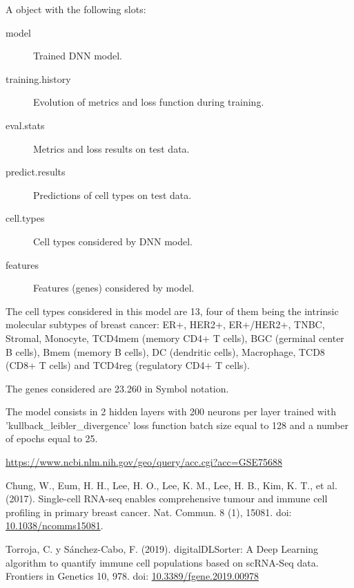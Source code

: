 \documentclass[a4paper]{book}
\begin{document}
\begin{Format}
A  object with the following slots:
\begin{description}
 \item[model] Trained DNN model.
\item[training.history] Evolution of metrics and loss function during
training.\item[eval.stats] Metrics and loss results on test data.
\item[predict.results] Predictions of cell types on test data.
\item[cell.types] Cell types considered by DNN model.
\item[features] Features (genes) considered by model.
\end{description}

\end{Format}
%
\begin{Details}\relax
The cell types considered in this model are 13, four of them being the
intrinsic molecular subtypes of breast cancer: ER+, HER2+, ER+/HER2+, TNBC,
Stromal, Monocyte, TCD4mem (memory CD4+ T cells), BGC (germinal center B
cells), Bmem (memory B cells), DC (dendritic cells), Macrophage, TCD8 (CD8+ T
cells) and TCD4reg (regulatory CD4+ T cells).

The genes considered are 23.260 in Symbol notation.

The model consists in 2 hidden layers with 200 neurons per layer trained with
'kullback\_leibler\_divergence' loss function  batch size equal to 128 and a
number of epochs equal to 25.
\end{Details}
%
\begin{Source}\relax
\url{https://www.ncbi.nlm.nih.gov/geo/query/acc.cgi?acc=GSE75688}
\end{Source}
%
\begin{References}\relax
Chung, W., Eum, H. H., Lee, H. O., Lee, K. M., Lee, H. B., Kim,
K. T., et al. (2017). Single-cell RNA-seq enables comprehensive tumour and
immune cell profiling in primary breast cancer. Nat. Commun. 8 (1), 15081.
doi: \url{10.1038/ncomms15081}.

Torroja, C. y Sánchez-Cabo, F. (2019). digitalDLSorter: A Deep Learning
algorithm to quantify immune cell populations based on scRNA-Seq data.
Frontiers in Genetics 10, 978. doi: \url{10.3389/fgene.2019.00978}
\end{References}
\end{document}
